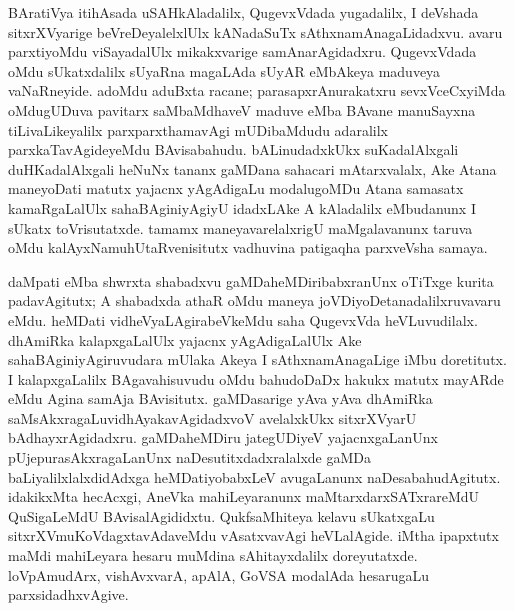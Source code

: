 BAratiVya itihAsada uSAHkAladalilx, QugevxVdada yugadalilx, I deVshada sitxrXVyarige beVreDeyalelxlUlx kANadaSuTx sAthxnamAnagaLidadxvu. avaru parxtiyoMdu viSayadalUlx mikakxvarige samAnarAgidadxru. QugevxVdada oMdu sUkatxdalilx sUyaRna magaLAda sUyAR eMbAkeya maduveya vaNaRneyide. adoMdu aduBxta racane; parasapxrAnurakatxru sevxVceCxyiMda oMdugUDuva pavitarx saMbaMdhaveV maduve eMba BAvane manuSayxna tiLivaLikeyalilx parxparxthamavAgi mUDibaMdudu adaralilx parxkaTavAgideyeMdu BAvisabahudu. bALinudadxkUkx suKadalAlxgali duHKadalAlxgali heNuNx tananx gaMDana sahacari mAtarxvalalx, Ake Atana maneyoDati matutx yajacnx yAgAdigaLu modalugoMDu Atana samasatx kamaRgaLalUlx sahaBAginiyAgiyU idadxLAke A kAladalilx eMbudanunx I sUkatx toVrisutatxde. tamamx maneyavarelalxrigU maMgalavanunx taruva oMdu kalAyxNamuhUtaRvenisitutx vadhuvina patigaqha parxveVsha samaya.

daMpati eMba shwrxta shabadxvu gaMDaheMDiribabxranUnx oTiTxge kurita padavAgitutx; A shabadxda athaR oMdu maneya joVDiyoDetanadalilxruvavaru eMdu. heMDati vidheVya\-LAgirabeVkeMdu saha QugevxVda heVLuvudilalx. dhAmiRka kalapxgaLalUlx yajacnx yAgAdi\-gaLalUlx Ake sahaBAginiyAgiruvudara mUlaka Akeya I sAthxnamAnagaLige iMbu doretitutx. I kalapxgaLalilx BAgavahisuvudu oMdu bahudoDaDx hakukx matutx mayARde eMdu Agina samAja BAvisitutx. gaMDasarige yAva yAva dhAmiRka saMsAkxragaLu\break vidhAyakavAgidadxvoV avelalxkUkx sitxrXVyarU bAdhayxrAgidadxru. gaMDaheMDiru jate\break\-gUDiyeV yajacnxgaLanUnx pUjepurasAkxragaLanUnx naDesutitxdadxralalxde gaMDa baLiyalilxlalx\-didAdxga heMDatiyobabxLeV avugaLanunx naDesabahudAgitutx. idakikxMta hecAcxgi, AneVka mahiLeyaranunx maMtarxdarxSATxrareMdU QuSigaLeMdU BAvisalAgididxtu. QukfsaMhiteya kelavu sUkatxgaLu sitxrXVmuKoVdagxtavAdaveMdu vAsatxvavAgi heVLalAgide. iMtha \hbox{ipapxtutx} maMdi mahiLeyara hesaru muMdina sAhitayxdalilx doreyutatxde. loVpAmudArx, vishAvxvarA, apAlA, GoVSA modalAda hesarugaLu parxsidadhxvAgive.

